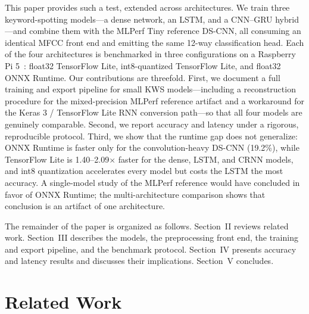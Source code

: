 \documentclass[conference,a4paper]{IEEEtran}
\begin{document}
This paper provides such a test, extended across architectures. We train three keyword-spotting models---a dense network, an LSTM, and a CNN--GRU hybrid---and combine them with the MLPerf Tiny reference DS-CNN, all consuming an identical MFCC front end and emitting the same 12-way classification head. Each of the four architectures is benchmarked in three configurations on a Raspberry Pi 5~\cite{raspberrypi5}: float32 TensorFlow Lite, int8-quantized TensorFlow Lite, and float32 ONNX Runtime. Our contributions are threefold. First, we document a full training and export pipeline for small KWS models---including a reconstruction procedure for the mixed-precision MLPerf reference artifact and a workaround for the Keras 3 / TensorFlow Lite RNN conversion path---so that all four models are genuinely comparable. Second, we report accuracy and latency under a rigorous, reproducible protocol. Third, we show that the runtime gap does not generalize: ONNX Runtime is faster only for the convolution-heavy DS-CNN (19.2\%), while TensorFlow Lite is 1.40--2.09$\times$ faster for the dense, LSTM, and CRNN models, and int8 quantization accelerates every model but costs the LSTM the most accuracy. A single-model study of the MLPerf reference would have concluded in favor of ONNX Runtime; the multi-architecture comparison shows that conclusion is an artifact of one architecture.

The remainder of the paper is organized as follows. Section~II reviews related work. Section~III describes the models, the preprocessing front end, the training and export pipeline, and the benchmark protocol. Section~IV presents accuracy and latency results and discusses their implications. Section~V concludes.

\section{Related Work}
\end{document}

